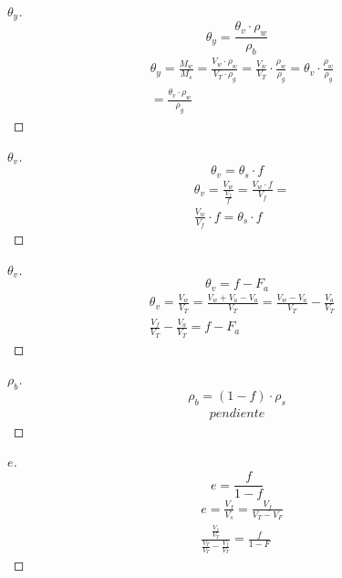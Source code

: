 \begin{proof}[$\theta_y$]
    \begin{equation}
        \theta_y = \frac{\theta_v\cdot\rho_w}{\rho_b}
    \end{equation}
    \begin{align*}
        &\theta_y =\frac{M_w}{M_s} = \frac{V_w \cdot \rho_w}{V_T \cdot \rho_g} = \frac{V_w}{V_T} \cdot \frac{\rho_w}{\rho_g} =\theta_v \cdot \frac{\rho_w}{\rho_g}\\
        &=\frac{\theta_v \cdot \rho_w}{\rho_g}
    \end{align*}
\end{proof}

\begin{proof}[$\theta_v$]
    \begin{equation}
        \theta_v =\theta_s \cdot f
    \end{equation}
    \begin{align*}
        &\theta_v = \frac{V_w}{\frac{V_f}{f}} = \frac{V_w \cdot f}{V_f} =\\
        &\frac{V_w}{V_f} \cdot f = \theta_s \cdot f
    \end{align*}
\end{proof}

\begin{proof}[$\theta_v$]
    \begin{equation}
        \theta_v = f - F_a
    \end{equation}
    \begin{align*}
        &\theta_v = \frac{V_w}{V_T} = \frac{V_w + V_a - V_a}{V_T} = \frac{V_w - V_a}{V_T} - \frac{V_a}{V_T}\\
        &\frac{V_f}{V_T} - \frac{V_a}{V_T} = f - F_a
    \end{align*}
\end{proof}

\begin{proof}[$\rho_b$]
    \begin{equation}
        \rho_b = \left(1 - f\right) \cdot \rho_s
    \end{equation}
    \begin{align*}
        pendiente
    \end{align*}
\end{proof}

\begin{proof}[$e$]
    \begin{equation}
        e = \frac{f}{1 - f}
    \end{equation}
    \begin{align*}
        &e = \frac{V_f}{V_s} = \frac{V_f}{V_T - V_F}\\
        &\frac{\frac{V_f}{V_T}}{\frac{V_T}{V_T} - \frac{V_f}{V_T}} = \frac{f}{1 - F}
    \end{align*}
\end{proof}

